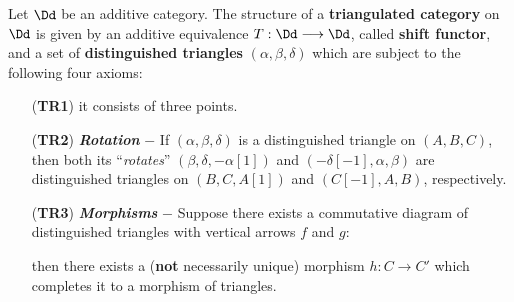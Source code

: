\begin{df}
    Let $\Dd$ be an additive category.
    The structure of a \textbf{triangulated category} on $\Dd$
    is given by an additive equivalence 
    $T : \Dd \longrightarrow \Dd$,
    called \textbf{shift functor}, 
    and a set of \textbf{distinguished triangles}
    $(\alpha,\beta,\delta)$
    which are subject to the following four axioms:
    \begin{itemize}
        \item[(\textbf{TR1})]\label{TR1}
        it consists of three points.
        
        
        \item[(\textbf{TR2})]\label{TR2}
        \emph{\textbf{Rotation}} $-$ 
        If $(\alpha,\beta,\delta)$ is a distinguished triangle on $(A,B,C)$,
        then both its ``\emph{rotates}''
        $(\beta,\delta,-\alpha[1])$ and $(-\delta[-1],\alpha,\beta)$
        are distinguished triangles on $(B,C,A[1])$ and $(C[-1],A,B)$, respectively.
        
        \item[(\textbf{TR3})]\label{TR3}
        \emph{\textbf{Morphisms}} $-$ 
        Suppose there exists a commutative diagram of 
        distinguished triangles with vertical arrows $f$ and $g$:
        \begin{center}
        \end{center}
        then there exists a (\textbf{not} necessarily unique) 
        morphism $h:C \to C'$ which 
        completes it to a morphism of triangles.
        

\end{itemize}
\end{df}

